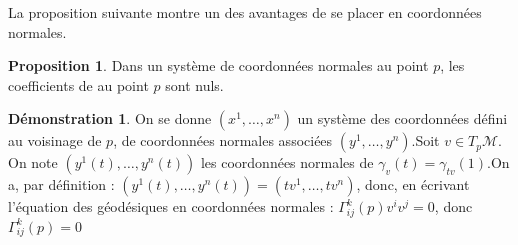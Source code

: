 \documentclass[12pt,a4paper]{article}
\theoremstyle{definition}
\newtheorem{prop}[thm]{Proposition}
\newtheorem*{dem}{Démonstration}
\begin{document}
La proposition suivante montre un des avantages de se placer en coordonnées normales.
\begin{prop}
Dans un système de coordonnées normales au point $p$, les coefficients de  au point $p$ sont nuls.
\end{prop}
\begin{dem}
On se donne $(x^1,\ldots,x^n)$ un système des coordonnées défini au voisinage de $p$, de coordonnées normales associées $(y^1,\ldots,y^n)$.\newline Soit $v\in T_p\mathcal{M}$. On note $(y^1(t),\ldots,y^n(t))$ les coordonnées normales de $\gamma_v(t)=\gamma_{tv}(1)$.\newline On a, par définition : $(y^1(t),\ldots,y^n(t))=(tv^1,\ldots,tv^n)$, donc, en écrivant l'équation des géodésiques en coordonnées normales : $\Gamma_{ij}^k(p)v^iv^j=0$, donc $\Gamma_{ij}^k(p)=0$
\end{dem}
\newpage
\end{document}
